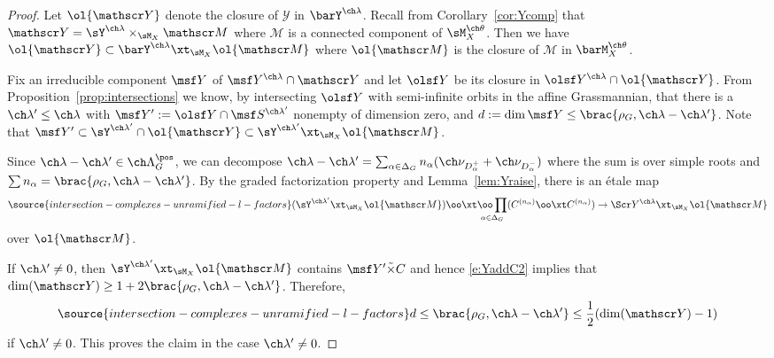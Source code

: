 \begin{proof}
Let $\ol{\mathscr Y}$ denote the closure of $\mathscr Y$ in $\barY^{\ch\lambda}$.
Recall from Corollary~\ref{cor:Ycomp} that $\mathscr Y =
\sY^{\ch\lambda} \times_{\sM_X} \mathscr M$
where $\mathscr M$ is a connected component of
$\sM_X^{\ch\theta}$.
Then we have $\ol{\mathscr Y} \subset \barY^{\ch\lambda} \xt_{\sM_X} \ol{\mathscr M}$
where $\ol{\mathscr M}$ is the closure of $\mathscr M$ in $\barM_X^{\ch\theta}$.



Fix an irreducible component $\msf Y$ of
$\msf Y^{\ch\lambda}\cap \mathscr Y$ and let $\olsf Y$ be its closure in
$\olsf Y^{\ch\lambda} \cap \ol{\mathscr Y}$.
From Proposition~\ref{prop:intersections} we know, by intersecting $\olsf Y$ with semi-infinite orbits in the affine Grassmannian, that there is a $\ch\lambda'\le \ch\lambda$ with $\msf Y':= \olsf Y \cap \msf S^{\ch\lambda'}$ nonempty of dimension zero, and $d:=\dim \msf Y \le \brac{ \rho_G, \ch\lambda-\ch\lambda'}$.
Note that $\msf Y' \subset \sY^{\ch\lambda'} \cap \ol{\mathscr Y}
\subset \sY^{\ch\lambda'} \xt_{\sM_X} \ol{\mathscr M}$.


Since $\ch\lambda - \ch\lambda' \in \ch\Lambda^\pos_G$, we can decompose
$\ch\lambda - \ch\lambda' = \sum_{\alpha\in \Delta_G} n_\alpha (\ch\nu_{D^+_\alpha}+\ch\nu_{D^-_\alpha})$
where the sum is over simple roots and
$\sum n_\alpha = \brac{\rho_G,\ch\lambda-\ch\lambda'}$.
By the graded factorization property and Lemma~\ref{lem:Yraise}, there is an \'etale map
\begin{equation} \label{e:YaddC2}
\source{intersection-complexes-unramified-l-factors}
    (\sY^{\ch\lambda'} \xt_{\sM_X} \ol{\mathscr M}) \oo\xt
    \underset{\alpha \in \Delta_G}{\oo\prod} (C^{(n_\alpha)}\oo\xt C^{(n_\alpha)})
    \to
    \Scr Y^{\ch\lambda} \xt_{\sM_X} \ol{\mathscr M}
\end{equation}
over $\ol{\mathscr M}$.

If $\ch\lambda' \ne 0$, then $\sY^{\ch\lambda'} \xt_{\sM_X} \ol{\mathscr M}$
contains $\msf Y' \tilde\times C$ and hence
\eqref{e:YaddC2} implies that
$\dim (\mathscr Y) \ge 1+2\brac{\rho_G,\ch\lambda-\ch\lambda'}$.
Therefore,
\begin{equation} \label{e:MVineq}
\source{intersection-complexes-unramified-l-factors}
d\le     \brac{\rho_G,\ch\lambda-\ch\lambda'} \le \frac 1 2 (\dim (\mathscr Y) - 1)
\end{equation}
if $\ch\lambda'\ne 0$.
This proves the
claim in the case $\ch\lambda' \ne 0$.


\end{proof}
